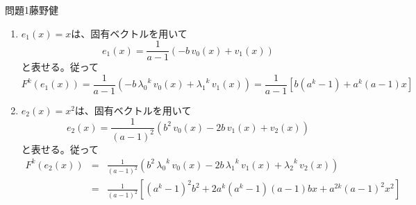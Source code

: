 \documentclass[fleqn]{jbook}
\begin{document}
\begin{answer}{問題1}{藤野健}
\begin{enumerate}
    \item $e_1(x) = x$は、固有ベクトルを用いて
\[
    e_1(x) = \frac{1}{a-1}(-b \, v_0(x) + v_1(x))
\]
と表せる。従って
\[
    F^k(e_1(x)) = \frac{1}{a-1}(-b \, {\lambda_0}^k \, v_0(x) + {\lambda_1}^k \, v_1(x)) = \frac{1}{a-1} \left[ b(a^k - 1) + a^k (a - 1) x \right]
\]

    \item $e_2(x) = x^2$は、固有ベクトルを用いて
\[
    e_2(x) = \frac{1}{(a-1)^2}(b^2 \, v_0(x) - 2b \, v_1(x) + v_2(x))
\]
と表せる。従って
\begin{eqnarray*}
    F^k(e_2(x)) & = &  \frac{1}{(a-1)^2}(b^2 \, {\lambda_0}^k \, v_0(x) - 2b \, {\lambda_1}^k \,v_1(x) + {\lambda_2}^k \, v_2(x)) \\
    & = & \frac{1}{(a-1)^2} \left[ (a^k - 1)^2 b^2 + 2 a^k (a^k - 1)(a - 1) b x + a^{2k} (a - 1)^2 x^2 \right]
\end{eqnarray*}

\end{enumerate}

\end{answer}
\end{document}
